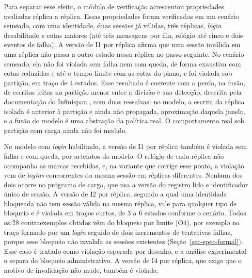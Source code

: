 Para separar esse efeito, o módulo de verificação acrescentou propriedades avaliadas réplica a réplica. Essas propriedades foram verificadas em um cenário semeado, com uma identidade, duas sessões já válidas, três réplicas, \emph{login} desabilitado e cotas maiores (até três mensagens por fila, relógio até cinco e dois eventos de falha). A versão de I1 por réplica afirma que uma sessão inválida em uma réplica não passa a outro estado nessa réplica no passo seguinte. No cenário semeado, ela não foi violada sem falha nem com queda, de forma exaustiva com cotas reduzidas e até o tempo-limite com as cotas do plano, e foi violada sob partição, em traço de 4 estados. Esse resultado é coerente com a perda, na fusão, de escritas feitas na partição menor entre a divisão e sua detecção, descrita pela documentação do Infinispan \cite[seção 7.1.1]{infinispan_configuring_15}, com duas ressalvas: no modelo, a escrita da réplica isolada é anterior à partição e ainda não propagada, aproximação daquela janela, e a fusão do modelo é uma abstração da política real. O comportamento real sob partição com carga ainda não foi medido.

No modelo com \emph{login} habilitado, a versão de I1 por réplica também é violada sem falha e com queda, por artefatos do modelo. O relógio de cada réplica não acompanha as marcas recebidas, e, na variante que corrige esse ponto, a violação vem de \emph{logins} concorrentes da mesma sessão em réplicas diferentes. Nenhum dos dois ocorre no programa de carga, que usa a versão do registro lido e identificador único de sessão. A versão de I2 por réplica, segundo a qual uma identidade bloqueada não tem sessão válida na mesma réplica, vale para qualquer tipo de bloqueio e é violada em traços curtos, de 3 a 6 estados conforme o cenário. Todos os 28 contraexemplos obtidos vêm do bloqueio por limite (O4), por exemplo no traço formado por um \emph{login} seguido de dois incrementos de tentativas falhas, porque esse bloqueio não invalida as sessões existentes (Seção~\ref{sec-spec-formal}). Esse caso é tratado como violação esperada por desenho, e a análise experimental o separa do bloqueio administrativo. A versão de I4 por réplica, que exige que o motivo de invalidação não mude, também é violada.

